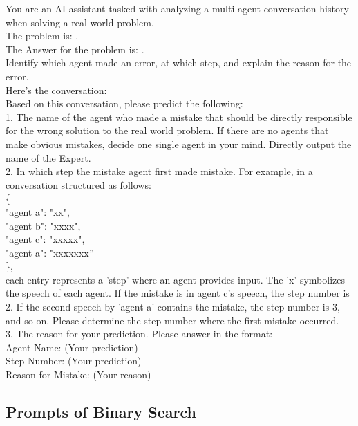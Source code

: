 \begin{boxL}
You are an AI assistant tasked with analyzing a multi-agent conversation history when solving a real world problem. \\
The problem is:  .\\
The Answer for the problem is: . \\
Identify which agent made an error, at which step, and explain the reason for the error. \\
Here's the conversation: \\
Based on this conversation, please predict the following:\\
1. The name of the agent who made a mistake that should be directly responsible for the wrong solution to the real world problem. If there are no agents that make obvious mistakes, decide one single agent in your mind. Directly output the name of the Expert.\\
2. In which step the mistake agent first made mistake. For example, in a conversation structured as follows: \\
\{ \\"agent a": "xx", \\
    "agent b": "xxxx",\\
    "agent c": "xxxxx",\\
    "agent a": "xxxxxxx”\\ \},    
\\
each entry represents a 'step' where an agent provides input. The 'x' symbolizes the speech of each agent. If the mistake is in agent c's speech, the step number is 2. If the second speech by 'agent a' contains the mistake, the step number is 3, and so on. Please determine the step number where the first mistake occurred.\\
3. The reason for your prediction. Please answer in the format: \\
Agent Name: (Your prediction) \\
Step Number: (Your prediction) \\
Reason for Mistake: (Your reason)
\end{boxL}




\subsection{Prompts of Binary Search}


